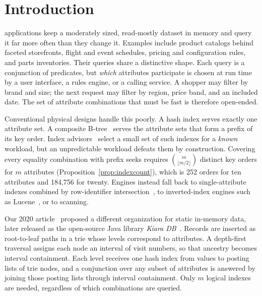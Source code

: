 \section{Introduction}
\label{sec:introduction}

 applications keep a moderately sized, read-mostly dataset in memory and query it far more often than they change it. Examples include product catalogs behind faceted storefronts, flight and event schedules, pricing and configuration rules, and parts inventories. Their queries share a distinctive shape. Each query is a conjunction of predicates, but \emph{which} attributes participate is chosen at run time by a user interface, a rules engine, or a calling service. A shopper may filter by brand and size; the next request may filter by region, price band, and an included date. The set of attribute combinations that must be fast is therefore open-ended.

Conventional physical designs handle this poorly. A hash index serves exactly one attribute set. A composite B-tree~\cite{bayer1972organization,comer1979ubiquitous} serves the attribute sets that form a prefix of its key order. Index advisors~\cite{chaudhuri1997efficient,valentin2000db2} select a small set of such indexes for a \emph{known} workload, but an unpredictable workload defeats them by construction. Covering every equality combination with prefix seeks requires $\binom{m}{\lfloor m/2\rfloor}$ distinct key orders for $m$ attributes (Proposition~\ref{prop:indexcount}), which is 252 orders for ten attributes and 184{,}756 for twenty. Engines instead fall back to single-attribute indexes combined by row-identifier intersection~\cite{oneil1997improved,lemire2016roaring}, to inverted-index engines such as Lucene~\cite{mccandless2010lucene}, or to scanning.

Our 2020 article~\cite{kapoor2020efficient} proposed a different organization for static in-memory data, later released as the open-source Java library \emph{Kiara DB}~\cite{kiara2026software}. Records are inserted as root-to-leaf paths in a trie whose levels correspond to attributes. A depth-first traversal assigns each node an interval of visit numbers, so that ancestry becomes interval containment. Each level receives one hash index from values to posting lists of trie nodes, and a conjunction over any subset of attributes is answered by joining those posting lists through interval containment. Only $m$ logical indexes are needed, regardless of which combinations are queried.

